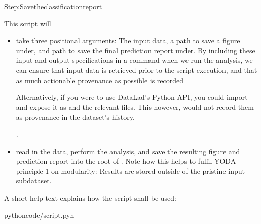 \begin{sphinxVerbatim}[commandchars=\\\{\}]
Step:Savetheclassificationreport

\end{sphinxVerbatim}
\sphinxresetverbatimhllines

\sphinxAtStartPar
This script will
\begin{itemize}
\item {} 
\sphinxAtStartPar
take three positional arguments: The input data, a path to save a figure under, and path to save the final prediction report under. By including these input and output specifications in a  command when we run the analysis, we can ensure that input data is retrieved prior to the script execution, and that as much actionable provenance as possible is recorded%
\begin{footnote}\sphinxAtStartFootnote
Alternatively, if you were to use DataLad’s Python API, you could import and expose it as  and  the relevant files. This however, would not record them as provenance in the dataset’s history.
%
\end{footnote}.

\item {} 
\sphinxAtStartPar
read in the data, perform the analysis, and save the resulting figure and  prediction report into the root of . Note how this helps to fulfil YODA principle 1 on modularity:
Results are stored outside of the pristine input subdataset.

\end{itemize}

\sphinxAtStartPar
A short help text explains how the script shall be used:

\begin{sphinxVerbatim}[commandchars=\\\{\}]
pythoncode/script.py\PYGZhy{}h



\end{sphinxVerbatim}

